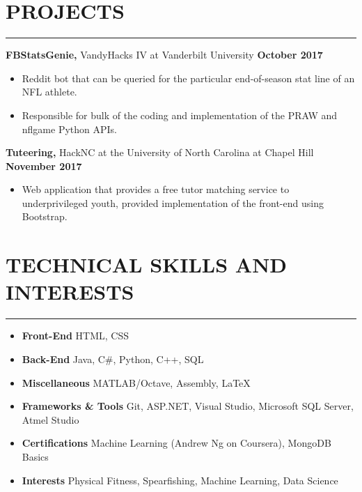 \documentclass[11pt]{article} %
\begin{document}
		\vspace{.1cm}
	
	\section*{PROJECTS}
		\hrule \relax
		\vspace{.4cm}
		
		\noindent \textbf{FBStatsGenie,} VandyHacks IV at Vanderbilt University \hfill\textbf{October 2017}
		\begin{itemize}[noitemsep,nolistsep, label={-}]
			\item Reddit bot that can be queried for the particular end-of-season stat line of an NFL athlete.
			\item Responsible for bulk of the coding and implementation of the PRAW and nflgame Python APIs.
		\end{itemize}
		
		\vspace{.1cm}
	
		\noindent \textbf{Tuteering,} HackNC at the University of North Carolina at Chapel Hill \hfill\textbf{November 2017}
		\begin{itemize}[noitemsep,nolistsep, label={-}]
			\item Web application that provides a free tutor matching service to underprivileged youth, provided implementation of the front-end using Bootstrap.
		\end{itemize}
	
		\vspace{.1cm}
	
	\section*{TECHNICAL SKILLS AND INTERESTS}
		\hrule \relax
		\vspace{.4cm}
		
		\begin{itemize}[noitemsep,nolistsep, label={}]
			\item \textbf{Front-End}                   \tabto*{5cm} HTML, CSS
			\item \textbf{Back-End}                    \tabto*{5cm} Java, C\#, Python, C++, SQL
			\item \textbf{Miscellaneous}             \tabto*{5cm} MATLAB/Octave, Assembly, \LaTeX
			\item \textbf{Frameworks \& Tools}  \tabto*{5cm} Git, ASP.NET, Visual Studio, Microsoft SQL Server, Atmel Studio
			\item \textbf{Certifications}			   \tabto*{5cm} Machine Learning (Andrew Ng on Coursera), MongoDB Basics
			\item \textbf{Interests}                     \tabto*{5cm} Physical Fitness, Spearfishing, Machine Learning, Data Science
		\end{itemize}
		
		\vspace{.1cm}
	
\end{document}
